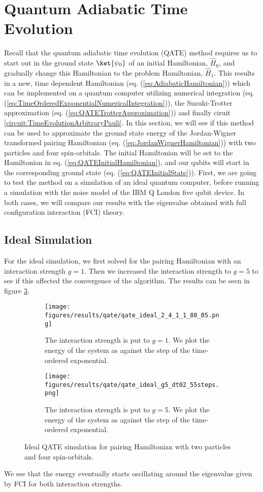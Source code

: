 \section{Quantum Adiabatic Time Evolution}
\label{sec:ResQATE}
Recall that the quantum adiabatic time evolution (QATE) method requires us to start out in the ground state $\ket{\psi_0}$ of an initial Hamiltonian, $\hat{H}_0$, and gradually change this Hamiltonian to the problem Hamiltonian, $\hat{H}_1$. This results in a new, time dependent Hamiltonian (eq. (\ref{eq:AdiabaticHamiltonian})) which can be implemented on a quantum computer utilizing numerical integration (eq. (\ref{eq:TimeOrderedExponentialNumericalIntegration})), the Suzuki-Trotter approximation (eq. (\ref{eq:QATETrotterApproximation})) and finally ciruit \ref{circuit:TimeEvolutionArbitraryPauli}. In this section, we will see if this method can be used to approximate the ground state energy of the Jordan-Wigner transformed pairing Hamiltonian (eq. (\ref{eq:JordanWignerHamiltonian})) with two particles and four spin-orbitals. The initial Hamiltonian will be set to the Hamiltonian in eq. (\ref{eq:QATEInitialHamiltonian}), and our qubits will start in the corresponding ground state (eq. (\ref{eq:QATEInitialState})). First, we are going to test the method on a simulation of an ideal quantum computer, before running a simulation with the noise model of the IBM Q London five qubit device. In both cases, we will compare our results with the eigenvalue obtained with full configuration interaction (FCI) theory.

\subsection{Ideal Simulation}
\label{subsec:ResQATEIdeal}
For the ideal simulation, we first solved for the pairing Hamiltonian with an interaction strength $g=1$. Then we increased the interaction strength to $g=5$ to see if this affected the convergence of the algorithm. The results can be seen in figure \ref{fig:idealQATE}.
\begin{figure}[H]
\begin{subfigure}{.5\textwidth}
  \centering
  \texttt{[image: figures/results/qate/qate\_ideal\_2\_4\_1\_1\_80\_05.png]}  
  \caption{The interaction strength is put to $g=1$. We plot the energy of the system as against the step of the time-ordered exponential.}
  \label{fig:qateideal24118005}
\end{subfigure}
\begin{subfigure}{.5\textwidth}
  \centering
  \texttt{[image: figures/results/qate/qate\_ideal\_g5\_dt02\_55steps.png]}  
  \caption{The interaction strength is put to $g=5$. We plot the energy of the system as against the step of the time-ordered exponential.}
  \label{fig:qateideal24155505}
\end{subfigure}
\caption{Ideal QATE simulation for pairing Hamiltonian with two particles and four spin-orbitals.}
\label{fig:idealQATE}
\end{figure}
We see that the energy eventually starts oscillating around the eigenvalue given by FCI for both interaction strengths.

